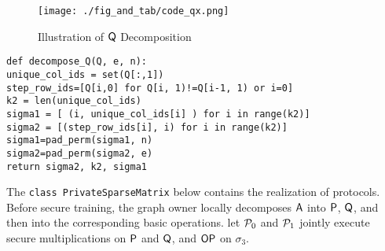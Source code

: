\begin{figure}[!t]
	\centering
	\texttt{[image: ./fig\_and\_tab/code\_qx.png]}
	\caption{Illustration of $\mathsf{Q}$ Decomposition}
	 \label{fig::code_q_compos}
\end{figure}

\begin{frame}{\texttt{def decompose\_Q(Q, e, n):}}
 \\\indent\texttt{unique\_col\_ids = set(Q[:,1])} 
 \\\indent\texttt{step\_row\_ids=[Q[i,0] for Q[i, 1)!=Q[i-1, 1) or i=0]}
 \\\indent\texttt{k2 = len(unique\_col\_ids)}
 \\\indent\texttt{sigma1 = [ (i, unique\_col\_ids[i]	) for i in range(k2)]}
 \\\indent\texttt{sigma2 = [(step\_row\_ids[i], i) for i in range(k2)] }
\\\indent\texttt{sigma1=pad\_perm(sigma1, n)} 
\\\indent\texttt{sigma2=pad\_perm(sigma2, e)} 
\\\indent\texttt{return sigma2, k2, sigma1}
\end{frame}
 
 
The \texttt{class PrivateSparseMatrix} below contains the realization of \osmm protocols.
Before secure training, the graph owner locally decomposes $\mathsf{A}$ into $\mathsf{P}$, $\mathsf{Q}$, and then into the corresponding basic operations.
\osmm let $\mathcal{P}_0$ and $\mathcal{P}_1$ jointly execute secure multiplications on $\mathsf{P}$ and $\mathsf{Q}$, and $\mathsf{OP}$ on $\sigma_3$.


